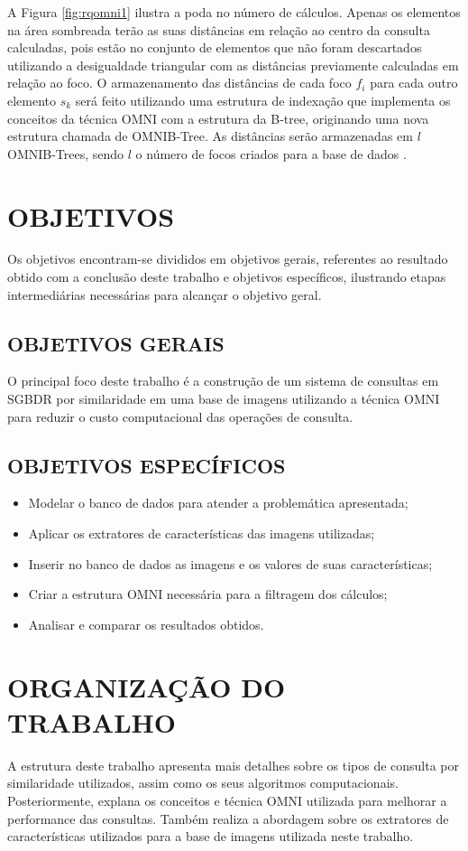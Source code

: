 A Figura \ref{fig:rqomni1} ilustra a poda no número de cálculos. Apenas os elementos na área sombreada terão as suas distâncias em relação ao centro da consulta calculadas, pois estão no
conjunto de elementos que não foram descartados utilizando a desigualdade triangular com as distâncias previamente calculadas em relação ao foco. O armazenamento das distâncias de cada foco ${f_i}$ para cada outro elemento $s_k$ será feito 
utilizando uma estrutura de indexação que implementa os conceitos da técnica OMNI com a estrutura da B-tree, originando uma nova estrutura chamada de OMNIB-Tree. As distâncias serão armazenadas em $l$ OMNIB-Trees, sendo $l$ o número de focos
criados para a base de dados \cite{Traina2001}.

\section{OBJETIVOS}
\label{sec:objetivos}
Os objetivos encontram-se divididos em objetivos gerais, referentes ao resultado obtido com a conclusão deste trabalho e objetivos específicos, ilustrando etapas intermediárias necessárias para alcançar o objetivo geral.
\subsection{OBJETIVOS GERAIS}
\label{subsec:objger}
O principal foco deste trabalho é a construção de um sistema de consultas em SGBDR por similaridade em uma base de imagens utilizando a técnica OMNI para reduzir o custo computacional das operações de consulta.

\subsection{OBJETIVOS ESPECÍFICOS}
\label{subsec:objesp}
\begin{itemize}
 \item Modelar o banco de dados para atender a problemática apresentada;
 \item Aplicar os extratores de características das imagens utilizadas;
 \item Inserir no banco de dados as imagens e os valores de suas características;
 \item Criar a estrutura OMNI necessária para a filtragem dos cálculos;
 \item Analisar e comparar os resultados obtidos.
\end{itemize}


\section{ORGANIZAÇÃO DO TRABALHO}
\label{sec:organizacaoTrabalho}

A estrutura deste trabalho apresenta mais detalhes sobre os tipos de consulta por similaridade utilizados, assim como os seus algoritmos computacionais. Posteriormente, explana os conceitos e técnica OMNI utilizada para
melhorar a performance das consultas. Também realiza a abordagem sobre os extratores de características utilizados para a base de imagens utilizada neste trabalho.
